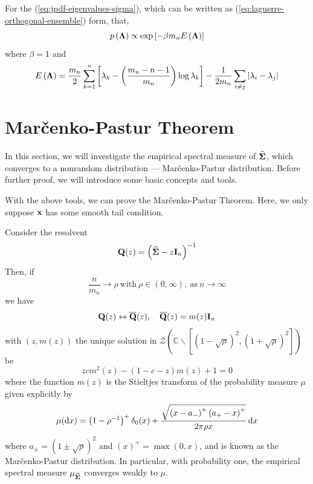 \begin{remark}
	For the (\ref{eq:jpdf-eigenvalues-sigma}), which can be written as (\ref{eq:laguerre-orthogonal-ensemble}) form, that,
	\begin{equation*}
		p\left(\boldsymbol{\Lambda}\right)\propto\exp\left[-\beta m_{n}E\left(\boldsymbol{\Lambda}\right)\right]
	\end{equation*}
	where \(\beta=1\) and
	\begin{equation*}
		E\left(\boldsymbol{\Lambda}\right)=\frac{m_{n}}{2}\sum_{k=1}^{n}\left[\lambda_{k}-\left(\frac{m_{n}-n-1}{m_{n}}\right)\log\lambda_{k}\right]-\frac{1}{2m_{n}}\sum_{i\neq j}\left|\lambda_{i}-\lambda_{j}\right|
	\end{equation*}
\end{remark}

\section{Mar\v{c}enko-Pastur Theorem}

In this section, we will investigate the empirical spectral measure of \(\widehat{\boldsymbol{\Sigma}}\), which converges to a nonrandom distribution --- Mar\v{c}enko-Pastur distribution. Before further proof, we will introduce some basic concepts and tools.

With the above tools, we can prove the Mar\v{c}enko-Pastur Theorem. Here, we only suppose \(\mathbf{x}\) has some smooth tail condition.
\begin{theorem}\label{thm:marcenko-pastur-theorem}
	Consider the resolvent
	\begin{equation*}
		\mathbf{Q}(z)=\left(\widehat{\boldsymbol{\Sigma}}-z\mathbf{I}_{n}\right)^{-1}
	\end{equation*}
	Then, if
	\begin{equation*}
		\frac{n}{m_{n}}\rightarrow\rho\ \text{with}\ \rho\in(0,\infty),\ \text{as}\ n\rightarrow\infty
	\end{equation*}
	we have
	\begin{equation*}
		\mathbf{Q}(z)\leftrightarrow\overline{\mathbf{Q}}(z),\quad\overline{\mathbf{Q}}(z)=m(z)\mathbf{I}_{n}
	\end{equation*}
	with \((z,m(z))\) the unique solution in \(\mathcal{Z}\left(\mathbb{C}\backslash\left[(1-\sqrt{\rho})^{2},(1+\sqrt{\rho})^{2}\right]\right)\) be
	\begin{equation*}
		zcm^{2}(z)-(1-c-z)m(z)+1=0
	\end{equation*}
	where the function \(m(z)\) is the Stieltjes transform of the probability measure \(\mu\) given explicitly by
	\begin{equation*}
		\mu(\mathop{}\!\mathrm{d} x)=\left(1-\rho^{-1}\right)^{+}\delta_{0}(x)+\frac{\sqrt{\left(x-a_{-}\right)^{+}\left(a_{+}-x\right)^{+}}}{2\pi\rho x}\mathop{}\!\mathrm{d} x
	\end{equation*}
	where \(a_{\pm}=(1 \pm \sqrt{\rho})^{2}\) and \((x)^{+}=\max (0, x)\), and is known as the Mar\v{c}enko-Pastur distribution. In particular, with probability one, the empirical spectral measure \(\mu_{\widehat{\boldsymbol{\Sigma}}}\) converges weakly to \(\mu \).
\end{theorem}

